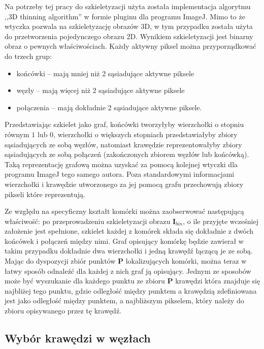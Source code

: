 \documentclass[declaration,shortabstract,mgr]{iithesis}
\newcommand{\image}{\mathbf{I}}
\begin{document}
Na potrzeby tej pracy do szkieletyzacji użyta została implementacja algorytmu ,,3D thinning algorithm''\cite{algo:3d-thinning} w formie pluginu dla programu ImageJ\cite{plugin:skeletonize-3d}.
Mimo to że wtyczka pozwala na szkieletyzację obrazów 3D, w tym przypadku została użyta do przetworzenia pojedynczego obrazu 2D.
Wynikiem szkieletyzacji jest binarny obraz o pewnych właściwościach.
Każdy aktywny piksel można przyporządkować do trzech grup:
\begin{itemize}
  \item końcówki -- mają mniej niż 2 sąsiadujące aktywne piksele
  \item węzły -- mają więcej niż 2 sąsiadujące aktywne piksele
  \item połączenia -- mają dokładnie 2 sąsiadujące aktywne piksele.
\end{itemize}
Przedstawiając szkielet jako graf, końcówki tworzyłyby wierzchołki o stopniu równym $1$ lub $0$, wierzchołki o większych stopniach przedstawiałyby zbiory sąsiadujących ze sobą węzłów, natomiast krawędzie reprezentowałyby zbiory sąsiadujących ze sobą połączeń (zakończonych zbiorem węzłów lub końcówką). Taką reprezentację grafową można uzyskać za pomocą kolejnej wtyczki dla programu ImageJ tego samego autora\cite{plugin:analyze-skeleton}. Poza standardowymi informacjami wierzchołki i krawędzie utworzonego za jej pomocą grafu przechowują zbiory pikseli które reprezentują.

Ze względu na specyficzny kształt komórki można zaobserwować następującą właściwość: po przeprowadzeniu szkieletyzacji obrazu $\image_{bin}$, o ile przyjęte wcześniej założenie jest spełnione, szkielet każdej z komórek składa się dokładnie z dwóch końcówek i połączeń między nimi. Graf opisujący komórkę będzie zawierał w takim przypadku dokładnie dwa wierzchołki i jedną krawędź łączącą je ze sobą. Mając do dyspozycji zbiór punktów $\mathbf{P}$ lokalizujących komórki, można teraz w łatwy sposób odnaleźć dla każdej z nich graf ją opisujący. Jednym ze sposobów może być wyszukanie dla każdego punktu ze zbioru $\mathbf{P}$ krawędzi która znajduje się najbliżej tego punktu, gdzie odległość między punktem a krawędzią zdefiniowana jest jako odległość między punktem, a najbliższym pikselem, który należy do zbioru opisywanego przez tę krawędź.

\subsection{Wybór krawędzi w węzłach}
\label{sec:spine-extending}
\end{document}
